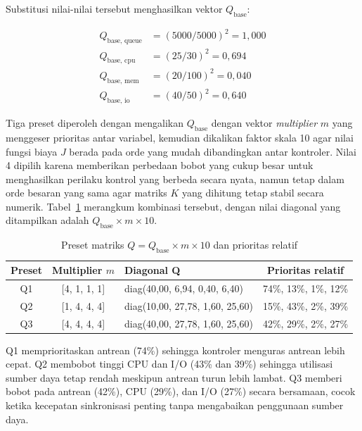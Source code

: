 Substitusi nilai-nilai tersebut menghasilkan vektor $Q_\text{base}$:

\begin{align*}
Q_\text{base, queue} &= (5000/5000)^2 = 1{,}000 \\
Q_\text{base, cpu}   &= (25/30)^2     = 0{,}694 \\
Q_\text{base, mem}   &= (20/100)^2    = 0{,}040 \\
Q_\text{base, io}    &= (40/50)^2     = 0{,}640
\end{align*}

Tiga preset diperoleh dengan mengalikan $Q_\text{base}$ dengan vektor \emph{multiplier} $m$
yang menggeser prioritas antar variabel, kemudian dikalikan faktor skala 10 agar nilai
fungsi biaya $J$ berada pada orde yang mudah dibandingkan antar kontroler.
Nilai 4 dipilih karena memberikan perbedaan bobot yang cukup besar untuk menghasilkan perilaku
kontrol yang berbeda secara nyata, namun tetap dalam orde besaran yang sama agar matriks $K$
yang dihitung tetap stabil secara numerik.
Tabel~\ref{tab:lqr-q-presets} merangkum kombinasi tersebut, dengan nilai diagonal yang
ditampilkan adalah $Q_\text{base} \times m \times 10$.

\begin{table}[H]
    \centering
    \caption{Preset matriks $Q = Q_\text{base} \times m \times 10$ dan prioritas relatif}
    \label{tab:lqr-q-presets}
    \renewcommand{\arraystretch}{1.4}
    \begin{tabular}{|c|c|l|c|}
    \hline
    \textbf{Preset} & \textbf{Multiplier $m$} & \textbf{Diagonal Q} & \textbf{Prioritas relatif} \\
    \hline
    Q1 & [4, 1, 1, 1] & diag(40{,}00, 6{,}94, 0{,}40, 6{,}40) & 74\%, 13\%, 1\%, 12\% \\
    \hline
    Q2 & [1, 4, 4, 4] & diag(10{,}00, 27{,}78, 1{,}60, 25{,}60) & 15\%, 43\%, 2\%, 39\% \\
    \hline
    Q3 & [4, 4, 4, 4] & diag(40{,}00, 27{,}78, 1{,}60, 25{,}60) & 42\%, 29\%, 2\%, 27\% \\
    \hline
    \end{tabular}
\end{table}

Q1 memprioritaskan antrean (74\%) sehingga kontroler menguras antrean lebih cepat.
Q2 membobot tinggi CPU dan I/O (43\% dan 39\%) sehingga utilisasi sumber daya tetap rendah
meskipun antrean turun lebih lambat.
Q3 memberi bobot pada antrean (42\%), CPU (29\%), dan I/O (27\%) secara bersamaan, cocok
ketika kecepatan sinkronisasi penting tanpa mengabaikan penggunaan sumber daya.

